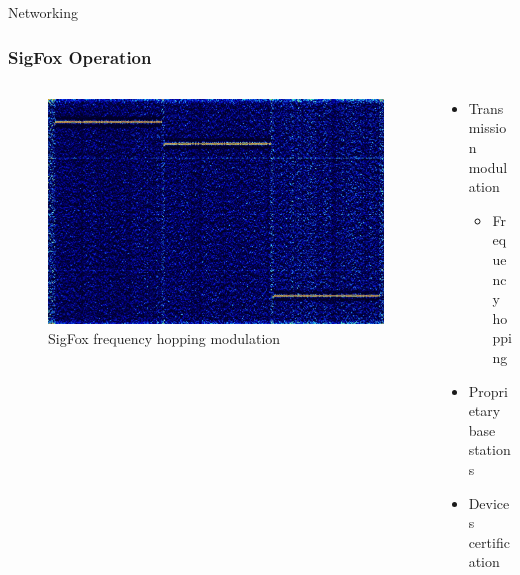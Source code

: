 \documentclass{beamer}
\begin{document}
  \begin{frame}{Networking}
    \frametitle{SigFox Operation}
    \begin{columns}
      \begin{column}{0.5\textwidth}
        \begin{figure}[htbp]
          \centering
          \includegraphics[width=\textwidth]{Sigfox_Spectrum_Analysis.jpg}
          \caption{SigFox frequency hopping modulation \cite{SIGFOXsignalwiki}}
          \label{fig:SigFox_Spectrum}
        \end{figure}
      \end{column}
      \begin{column}{0.5\textwidth}
        \begin{itemize}
          \item Transmission modulation
          \begin{itemize}
            \item Frequency hopping
          \end{itemize}
          \item Proprietary base stations
          \item Devices certification
        \end{itemize}
      \end{column}
    \end{columns}
  \end{frame}
\end{document}
